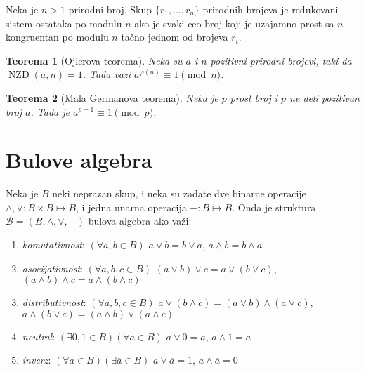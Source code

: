 \documentclass[12p,14paper]{article}
\DeclareMathOperator{\nzd}{NZD}
\newtheorem*{theorem}{Teorema}
\begin{document}
\begin{multicols}{2}
    Neka je $n > 1$ prirodni broj. Skup $\{ r_1, \ldots, r_n \}$ prirodnih 
    brojeva je redukovani sistem ostataka po modulu $n$ ako je svaki ceo broj 
    koji je uzajamno prost sa $n$ kongruentan po modulu $n$ tačno jednom od 
    brojeva $r_i$.

    \begin{theorem}[Ojlerova teorema]
        Neka su $a$ i $n$ pozitivni prirodni brojevi, taki da $\nzd(a, n) = 1$.
        Tada vazi $a^{\varphi(n)} \equiv 1 \pmod n$.
    \end{theorem}

    \begin{theorem}[Mala Germanova teorema]
        Neka je $p$ prost broj i $p$ ne deli pozitivan broj $a$. 
        Tada je $a^{p-1} \equiv 1 \pmod p$.
    \end{theorem}

\section{Bulove algebra}

    Neka je $B$ neki neprazan skup, i neka su zadate dve binarne operacije 
    $\land, \lor : B \times B \mapsto B$, i jedna unarna operacija 
    $- : B \mapsto B$. Onda je struktura $\mathcal{B} = (B, \land, \lor, -)$ 
    bulova algebra ako važi:
    \begin{enumerate}
        \itemsep0em
        \item [B.1] \textit{komutativnost}:
            $(\forall a,b \in B)$ 
            $a \lor b = b \lor a$, 
            $a \land b = b \land a$
        \item [B.2] \textit{asocijativnost}:
            $(\forall a,b,c \in B)$ 
            $(a \lor b) \lor c = a \lor (b \lor c)$, 
            $(a \land b) \land c = a \land (b \land c)$
        \item [B.3] \textit{distributivnost}:
            $(\forall a,b,c \in B)$ 
            $a \lor (b \land c) = (a \lor b) \land (a \lor c)$,
            $a \land (b \lor c) = (a \land b) \lor (a \land c)$
        \item [B.4] \textit{neutral}:
            $(\exists 0,1 \in B)(\forall a \in B)$ 
            $a \lor 0 = a$, 
            $a \land 1 = a$
        \item [B.5] \textit{inverz}:
            $(\forall a \in B)(\exists \overline{a} \in B)$ 
            $a \lor \overline{a} = 1$, 
            $a \land \overline{a} = 0$
    \end{enumerate}


\end{multicols}
\end{document}
